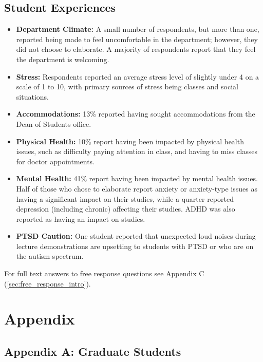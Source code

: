 \documentclass[oneside]{book}   %
\begin{document}
\section{Student Experiences}
\begin{itemize}
	\item \textbf{Department Climate:} A small number of respondents, but more than one, reported being made to feel uncomfortable in the department; however, they did not choose to elaborate. A majority of respondents report that they feel the department is welcoming.
	\item \textbf{Stress:} Respondents reported an average stress level of slightly under 4 on a scale of 1 to 10, with primary sources of stress being classes and social situations.
	\item \textbf{Accommodations:} 13\% reported having sought accommodations from the Dean of Students office.
	\item \textbf{Physical Health:} 10\% report having been impacted by physical health issues, such as difficulty paying attention in class, and having to miss classes for doctor appointments.
	\item \textbf{Mental Health:} 41\% report having been impacted by mental health issues. Half of those who chose to elaborate report anxiety or anxiety-type issues as having a significant impact on their studies, while a quarter reported depression (including chronic) affecting their studies. ADHD was also reported as having an impact on studies.
	\item \textbf{PTSD Caution:} One student reported that unexpected loud noises during lecture demonstrations are upsetting to students with PTSD or who are on the autism spectrum.
\end{itemize}

For full text answers to free response questions see Appendix C (\cref{sec:free_response_intro}).

\chapter{Appendix}
\label{ch:appendix}
\section{Appendix A: Graduate Students}
\label{sec:app_A}
\end{document}
